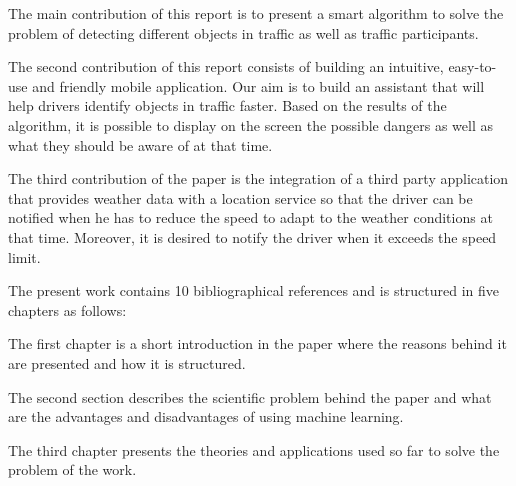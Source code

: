 \documentclass[12pt]{report}
\renewcommand{\_}{\kern-1.5pt\textunderscore\kern-1.5pt}
\begin{document}
\begin{justify}
The main contribution of this report is to present a smart algorithm to solve the problem of detecting different objects in traffic as well as traffic participants. 
\end{justify}\par

\begin{justify}
The second contribution of this report consists of building an intuitive, easy-to-use and friendly mobile application. Our aim is to build an assistant that will help drivers identify objects in traffic faster. Based on the results of the algorithm, it is possible to display on the screen the possible dangers as well as what they should be aware of at that time.
\end{justify}\par

\begin{justify}
The third contribution of the paper is the integration of a third party application that provides weather data with a location service so that the driver can be notified when he has to reduce the speed to adapt to the weather conditions at that time. Moreover, it is desired to notify the driver when it exceeds the speed limit.
\end{justify}\par

\begin{justify}
The present work contains 10 bibliographical references and is structured in five chapters as follows:
\end{justify}\par

\begin{justify}
The first chapter is a short introduction in the paper where the reasons behind it are presented and how it is structured.
\end{justify}\par

\begin{justify}
The second section describes the scientific problem behind the paper and what are the advantages and disadvantages of using machine learning.
\end{justify}\par

\begin{justify}
The third chapter presents the theories and applications used so far to solve the problem of the work.
\end{justify}\par
\end{document}
